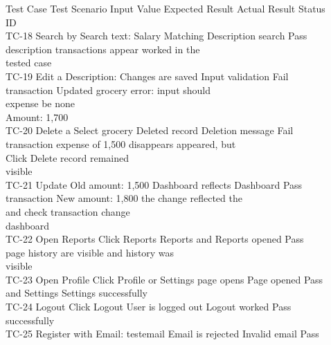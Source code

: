 \documentclass[12pt,a4paper]{report}
\begin{document}
\smallskip
Test Case Test Scenario Input Value          Expected Result Actual Result               Status\\ 
ID\\ 
TC-18     Search by       Search text: Salary Matching             Description search Pass\\ 
description                        transactions appear worked in the\\ 
tested case\\ 
TC-19     Edit a          Description:       Changes are saved Input validation          Fail\\ 
transaction     Updated grocery                          error: input should\\ 
expense                                  be none\\ 
Amount: 1,700\\ 
TC-20     Delete a        Select grocery     Deleted record        Deletion message      Fail\\ 
transaction     expense of 1,500   disappears            appeared, but\\ 
Click Delete                             record remained\\ 
visible\\ 
TC-21     Update          Old amount: 1,500 Dashboard reflects Dashboard                 Pass\\ 
transaction     New amount: 1,800 the change             reflected the\\ 
and check                                                transaction change\\ 
dashboard\\ 
TC-22     Open Reports    Click Reports      Reports and           Reports opened        Pass\\ 
page                               history are visible   and history was\\ 
visible\\ 
TC-23     Open Profile    Click Profile or   Settings page opens Page opened             Pass\\ 
and Settings    Settings                                 successfully\\ 
TC-24     Logout          Click Logout       User is logged out    Logout worked         Pass\\ 
successfully\\ 
TC-25     Register with   Email: testemail   Email is rejected     Invalid email         Pass\\ 
\end{document}
